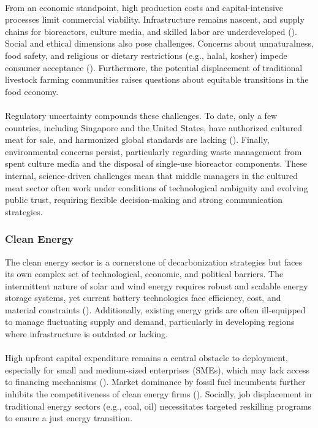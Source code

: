 	\paragraph*{} From an economic standpoint, high production costs and capital-intensive processes limit commercial viability. Infrastructure remains nascent, and supply chains for bioreactors, culture media, and skilled labor are underdeveloped (\textcite{Stephens2018}). Social and ethical dimensions also pose challenges. Concerns about unnaturalness, food safety, and religious or dietary restrictions (e.g., halal, kosher) impede consumer acceptance (\textcite{Bryant2020}). Furthermore, the potential displacement of traditional livestock farming communities raises questions about equitable transitions in the food economy.
	
	\paragraph*{} Regulatory uncertainty compounds these challenges. To date, only a few countries, including Singapore and the United States, have authorized cultured meat for sale, and harmonized global standards are lacking (\textcite{SFA2020, FDA2023}). Finally, environmental concerns persist, particularly regarding waste management from spent culture media and the disposal of single-use bioreactor components. These internal, science-driven challenges mean that middle managers in the cultured meat sector often work under conditions of technological ambiguity and evolving public trust, requiring flexible decision-making and strong communication strategies.
	
	\subsubsection{Clean Energy}
	The clean energy sector is a cornerstone of decarbonization strategies but faces its own complex set of technological, economic, and political barriers. The intermittent nature of solar and wind energy requires robust and scalable energy storage systems, yet current battery technologies face efficiency, cost, and material constraints (\textcite{Zhang2016, IEA2021}). Additionally, existing energy grids are often ill-equipped to manage fluctuating supply and demand, particularly in developing regions where infrastructure is outdated or lacking.
	
	\paragraph*{} High upfront capital expenditure remains a central obstacle to deployment, especially for small and medium-sized enterprises (SMEs), which may lack access to financing mechanisms (\textcite{Mngumi2022}). Market dominance by fossil fuel incumbents further inhibits the competitiveness of clean energy firms (\textcite{IRENA2017}). Socially, job displacement in traditional energy sectors (e.g., coal, oil) necessitates targeted reskilling programs to ensure a just energy transition.
	
